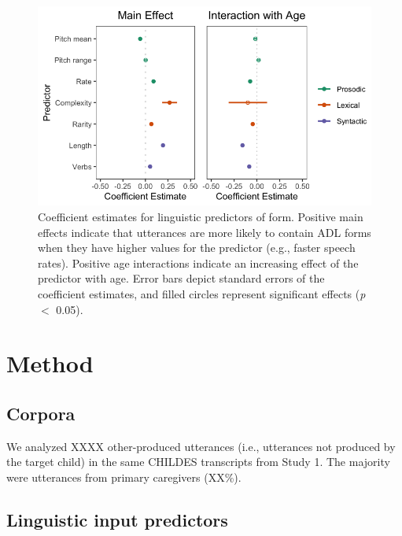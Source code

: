\documentclass[10pt, letterpaper]{article}
\newenvironment{CodeChunk}{}{}
\begin{document}
\begin{CodeChunk}
\begin{figure}[h]

{\centering \includegraphics{figs/ling-predictors-fig-1} 

}

\caption[Coefficient estimates for linguistic predictors of form]{Coefficient estimates for linguistic predictors of form. Positive main effects indicate that utterances are more likely to contain ADL forms when they have higher values for the predictor (e.g., faster speech rates). Positive age interactions indicate an increasing effect of the predictor with age. Error bars depict standard errors of the coefficient estimates, and filled circles represent significant effects (\textit{p} $<$ 0.05).}\label{fig:ling-predictors-fig}
\end{figure}
\end{CodeChunk}

\hypertarget{method-1}{%
\section{Method}\label{method-1}}

\hypertarget{corpora-1}{%
\subsection{Corpora}\label{corpora-1}}

We analyzed XXXX other-produced utterances (i.e., utterances not
produced by the target child) in the same CHILDES transcripts from Study
1. The majority were utterances from primary caregivers (XX\%).

\hypertarget{linguistic-input-predictors}{%
\subsection{Linguistic input
predictors}\label{linguistic-input-predictors}}
\end{document}
